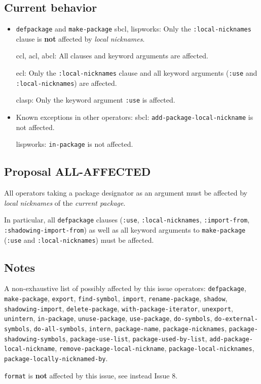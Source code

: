 \documentclass[11pt]{article}
\begin{document}
\subsection{Current behavior}
\label{sec:org5166234}
\begin{itemize}
\item \texttt{defpackage} and \texttt{make-package}
sbcl, lispworks:
  Only the \texttt{:local-nicknames} clause is \textbf{not} affected by \emph{local nicknames}.

ccl, acl, abcl:
  All clauses and keyword arguments are affected.

ecl:
  Only the \texttt{:local-nicknames} clause and all keyword arguments (\texttt{:use} and
  \texttt{:local-nicknames}) are affected.

clasp:
  Only the keyword argument \texttt{:use} is affected.
\item Known exceptions in other operators:
sbcl: \texttt{add-package-local-nickname} is not affected.

lispworks: \texttt{in-package} is not affected.
\end{itemize}
\subsection{Proposal ALL-AFFECTED}
\label{sec:orgb9d1dd7}
All operators taking a package designator as an argument must be affected by
\emph{local nicknames} of the \emph{current package}.

In particular, all \texttt{defpackage} clauses (\texttt{:use}, \texttt{:local-nicknames},
\texttt{:import-from}, \texttt{:shadowing-import-from}) as well as all keyword arguments to
\texttt{make-package} (\texttt{:use} and \texttt{:local-nicknames}) must be affected.
\subsection{Notes}
\label{sec:org8aaf4cf}
A non-exhaustive list of possibly affected by this issue operators:
  \texttt{defpackage}, \texttt{make-package}, \texttt{export}, \texttt{find-symbol}, \texttt{import},
  \texttt{rename-package}, \texttt{shadow}, \texttt{shadowing-import}, \texttt{delete-package},
  \texttt{with-package-iterator}, \texttt{unexport}, \texttt{unintern}, \texttt{in-package}, \texttt{unuse-package},
  \texttt{use-package}, \texttt{do-symbols}, \texttt{do-external-symbols}, \texttt{do-all-symbols}, \texttt{intern},
  \texttt{package-name}, \texttt{package-nicknames}, \texttt{package-shadowing-symbols},
  \texttt{package-use-list}, \texttt{package-used-by-list}, \texttt{add-package-local-nickname},
  \texttt{remove-package-local-nickname}, \texttt{package-local-nicknames},
  \texttt{package-locally-nicknamed-by}.

\texttt{format} is \textbf{not} affected by this issue, see instead Issue 8.
\end{document}
